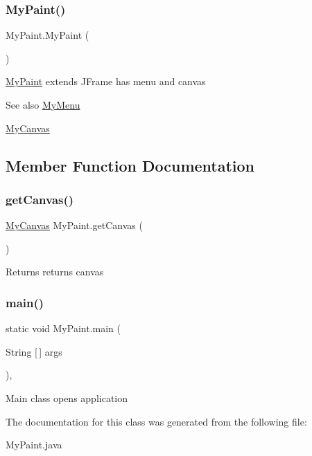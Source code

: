 \subsubsection{\texorpdfstring{My\+Paint()}{MyPaint()}}
{\footnotesize\ttfamily My\+Paint.\+My\+Paint (\begin{DoxyParamCaption}{ }\end{DoxyParamCaption})\hspace{0.3cm}{\ttfamily [inline]}}

\hyperlink{classMyPaint}{My\+Paint} extends J\+Frame has menu and canvas \begin{DoxySeeAlso}{See also}
\hyperlink{classMyMenu}{My\+Menu} 

\hyperlink{classMyCanvas}{My\+Canvas} 
\end{DoxySeeAlso}


\subsection{Member Function Documentation}
\mbox{\label{classMyPaint_a25a170deecb5b97feee8dcf377cb79f3}} 
\subsubsection{\texorpdfstring{get\+Canvas()}{getCanvas()}}
{\footnotesize\ttfamily \hyperlink{classMyCanvas}{My\+Canvas} My\+Paint.\+get\+Canvas (\begin{DoxyParamCaption}{ }\end{DoxyParamCaption})\hspace{0.3cm}{\ttfamily [inline]}}

\begin{DoxyReturn}{Returns}
returns canvas 
\end{DoxyReturn}
\mbox{\label{classMyPaint_a4f39e825a285bcf19879a1f60a5f4c10}} 
\subsubsection{\texorpdfstring{main()}{main()}}
{\footnotesize\ttfamily static void My\+Paint.\+main (\begin{DoxyParamCaption}\item[{String \mbox{[}$\,$\mbox{]}}]{args }\end{DoxyParamCaption})\hspace{0.3cm}{\ttfamily [inline]}, {\ttfamily [static]}}

Main class opens application 

The documentation for this class was generated from the following file\+:\begin{DoxyCompactItemize}
\item 
My\+Paint.\+java\end{DoxyCompactItemize}
